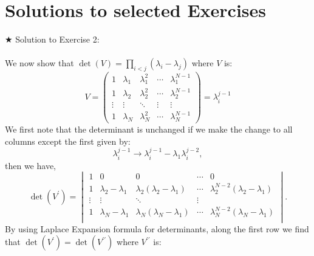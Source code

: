 \documentclass[11pt]{article}
\begin{document}
\begin{footnotesize} 
	\begin{mdframed}[backgroundcolor=mauve!3] 
			
	\end{mdframed} 
\end{footnotesize}

\section{\label{sec:solutions}Solutions to selected Exercises} 

\noindent $\bigstar$ Solution to Exercise 2:
\\ \\ 
We now show that $\det(V) = \prod_{i<j} (\lambda_i - \lambda_j)$ where $V$ is: 
\begin{equation*}
	V = 
	\begin{pmatrix}
		1 & \lambda_1 & \lambda_{1}^{2} & \cdots & \lambda_{1}^{N-1} \\
		1 & \lambda_2 & \lambda_{2}^{2} & \cdots & \lambda_{2}^{N-1} \\ 
		\vdots  & \vdots  & \ddots & \vdots & \vdots \\
		1 & \lambda_N & \lambda_{N}^{2} & \cdots & \lambda_{N}^{N-1} 
	\end{pmatrix} = \lambda_{i}^{j-1} 
\end{equation*}
We first note that the determinant is unchanged
if we make the change to all columns except the first given by:
\begin{equation}
	\lambda_{i}^{j-1} \to \lambda_{i}^{j-1} - \lambda_{1} \lambda_{i}^{j-2},
\end{equation}
then we have, 
\begin{equation}
	\det(V^{\prime}) = 
	\begin{vmatrix}
		1 & 0 & 0 & \cdots & 0 \\
		1 & \lambda_2 - \lambda_1 & \lambda_2(\lambda_2 - \lambda_1) & \cdots & \lambda_2^{N-2}(\lambda_2 - \lambda_1) \\ 
		\vdots  & \vdots  & \ddots & \vdots  \\
		1 & \lambda_N - \lambda_1 & \lambda_N(\lambda_N - \lambda_1) & \cdots & \lambda_N^{N-2}(\lambda_N - \lambda_1) \\
	\end{vmatrix}.
\end{equation}
By using Laplace Expansion formula for determinants, along the first row we find that $\det(V^{\prime}) = \det(V^{\prime\prime})$ where $V^{\prime\prime}$ is:
\end{document}

